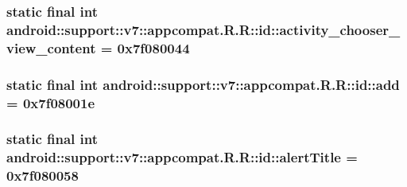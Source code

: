 \hypertarget{classandroid_1_1support_1_1v7_1_1appcompat_1_1_r_1_1id_648e9aacb1480c6fd78de23485103257}{
\subsubsection[{activity\_\-chooser\_\-view\_\-content}]{\setlength{\rightskip}{0pt plus 5cm}static final int android::support::v7::appcompat.R.R::id::activity\_\-chooser\_\-view\_\-content = 0x7f080044}}
\label{classandroid_1_1support_1_1v7_1_1appcompat_1_1_r_1_1id_648e9aacb1480c6fd78de23485103257}


\hypertarget{classandroid_1_1support_1_1v7_1_1appcompat_1_1_r_1_1id_ff685bf6aca8edd94b478f787029034e}{
\subsubsection[{add}]{\setlength{\rightskip}{0pt plus 5cm}static final int android::support::v7::appcompat.R.R::id::add = 0x7f08001e}}
\label{classandroid_1_1support_1_1v7_1_1appcompat_1_1_r_1_1id_ff685bf6aca8edd94b478f787029034e}


\hypertarget{classandroid_1_1support_1_1v7_1_1appcompat_1_1_r_1_1id_09e2bfb4f7c0346142d3f6dd16a7df90}{
\subsubsection[{alertTitle}]{\setlength{\rightskip}{0pt plus 5cm}static final int android::support::v7::appcompat.R.R::id::alertTitle = 0x7f080058}}
\label{classandroid_1_1support_1_1v7_1_1appcompat_1_1_r_1_1id_09e2bfb4f7c0346142d3f6dd16a7df90}


